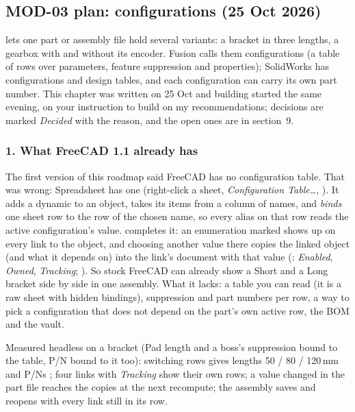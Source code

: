 \subsection{MOD-03 plan: configurations (25 Oct 2026)}\label{sec:mod03-plan}

 lets one part or assembly file hold several variants: a bracket in three lengths, a gearbox
with and without its encoder. Fusion calls them configurations (a table of rows over parameters, feature
suppression and properties); SolidWorks has configurations and design tables, and each configuration can
carry its own part number. This chapter was written on 25 Oct and building started the same evening, on
your instruction to build on my recommendations; decisions are marked \emph{Decided} with the reason, and
the open ones are in section~9.

\subsubsection*{1. What FreeCAD 1.1 already has}

The first version of this roadmap said FreeCAD has no configuration table. That was wrong: Spreadsheet has one
(right-click a sheet, \emph{Configuration Table\dots}, ).
It adds a dynamic  to an object, takes its items from a column of names, and
\emph{binds} one sheet row to the row of the chosen name, so every alias on that row reads the active
configuration's value.  completes it: an enumeration marked  shows up
on every link to the object, and choosing another value there copies the linked object (and what it depends
on) into the link's document with that value (: \emph{Enabled}, \emph{Owned},
\emph{Tracking}; ). So stock FreeCAD can already show a Short and a Long bracket side
by side in one assembly. What it lacks: a table you can read (it is a raw sheet with hidden bindings),
suppression and part numbers per row, a way to pick a configuration that does not depend on the part's own
active row, the BOM and the vault.

Measured headless on a bracket (Pad length and a boss's suppression bound to the table, P/N bound to it too):
switching rows gives lengths 50 / 80 / 120\,mm and P/Ns ; four links with \emph{Tracking}
show their own rows; a value changed in the part file reaches the copies at the next recompute; the
assembly saves and reopens with every link still in its row.

